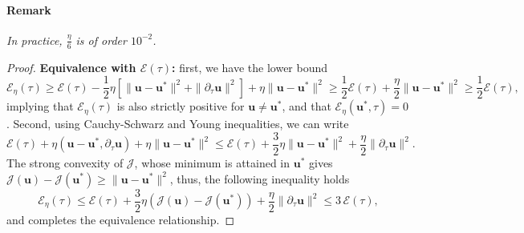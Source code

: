 \documentclass[11pt]{article}
\newcommand{\bu}{\mathbf{u}}
\begin{document}
\paragraph{Remark} \textit{In practice, $\frac{\eta}{6}$ is of order $10^{-2}$. }
\begin{proof}\textbf{Equivalence with $\mathcal{E}(\tau)$: }first, we have the lower bound $$
\mathcal{E}_\eta(\tau) \ge \mathcal E(\tau)-\frac{1}{2}\eta \left [\|\bu-\bu^*\|^2 + \|\partial_\tau\bu\|^2 \right ]+\eta\|\bu-\bu^*\|^2 \ge \frac{1}{2 }\mathcal{E}(\tau) + \frac{\eta}{2}\|\bu-\bu^*\|^2\ge \frac{1}{2 }\mathcal{E}(\tau),
$$implying that $\mathcal{E}_\eta(\tau) $ is also strictly positive for $\bu \ne \bu^*$, and that $\mathcal{E}_\eta(\bu^*,\tau)=0$. Second, using Cauchy-Schwarz and Young inequalities, we can write
$$
\mathcal E(\tau)+\eta(\bu-\bu^*,\partial_\tau\bu)+\eta\|\bu-\bu^*\|^2 \leq \mathcal E(\tau) + \frac{3}{2}\eta \|\bu - \bu^*\|^2 + \frac{\eta}{2} \|\partial_\tau \bu\|^2.
$$The strong convexity of $\mathcal{J}$, whose minimum is attained in $\bu^*$ gives $\mathcal{J}(\bu) - \mathcal{J}(\bu^*) \ge \|\bu - \bu^*\|^2$, thus, the following inequality holds
$$\mathcal E_\eta(\tau) \leq \mathcal E(\tau) + \frac{3}{2}\eta \left (\mathcal{J}(\bu)-\mathcal{J}(\bu^*)  \right ) + \frac{\eta}{2} \|\partial_\tau \bu\|^2 \leq 3 \, \mathcal E(\tau),
$$and completes the equivalence relationship.


\end{proof}
\end{document}
